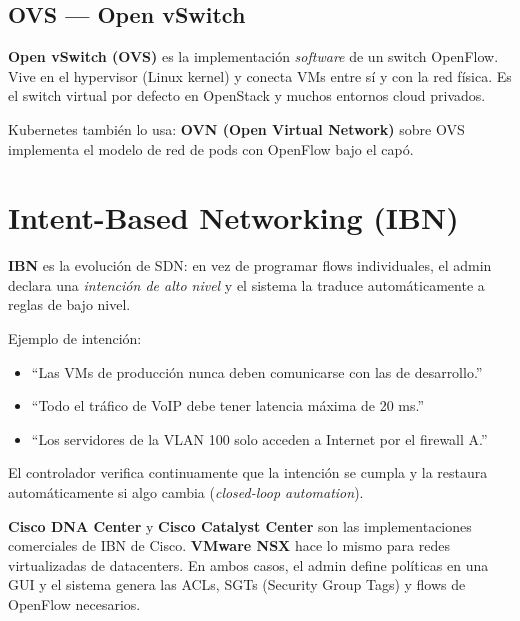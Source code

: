 \subsection{OVS — Open vSwitch}

\begin{moderno}
 \textbf{Open vSwitch (OVS)} es la implementación \emph{software} de un
switch OpenFlow. Vive en el hypervisor (Linux kernel) y conecta VMs entre sí y con la
red física. Es el switch virtual por defecto en OpenStack y muchos entornos cloud privados.

Kubernetes también lo usa: \textbf{OVN (Open Virtual Network)} sobre OVS implementa
el modelo de red de pods con OpenFlow bajo el capó.
\end{moderno}

\section{ Intent-Based Networking (IBN)}

\begin{concepto}
\textbf{IBN} es la evolución de SDN: en vez de programar flows individuales, el admin
declara una \emph{intención de alto nivel} y el sistema la traduce automáticamente a
reglas de bajo nivel.

Ejemplo de intención:
\begin{itemize}
    \item ``Las VMs de producción nunca deben comunicarse con las de desarrollo.''
    \item ``Todo el tráfico de VoIP debe tener latencia máxima de 20 ms.''
    \item ``Los servidores de la VLAN 100 solo acceden a Internet por el firewall A.''
\end{itemize}

El controlador verifica continuamente que la intención se cumpla y la restaura
automáticamente si algo cambia (\emph{closed-loop automation}).
\end{concepto}

\begin{ejemplo}
\textbf{Cisco DNA Center} y \textbf{Cisco Catalyst Center} son las implementaciones
comerciales de IBN de Cisco. \textbf{VMware NSX} hace lo mismo para redes virtualizadas
de datacenters. En ambos casos, el admin define políticas en una GUI y el sistema genera
las ACLs, SGTs (Security Group Tags) y flows de OpenFlow necesarios.
\end{ejemplo}

